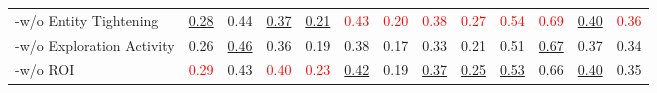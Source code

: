 \begin{table}[htbp]
{\begin{tabular}{l|cc|cc|cc|cc|cc|cc}
\quad -w/o Entity Tightening & \underline{0.28} & 0.44 & \underline{0.37} & \underline{0.21} & \textcolor{red}{0.43} & \textcolor{red}{0.20} & \textcolor{red}{0.38} & \textcolor{red}{0.27} & \textcolor{red}{0.54} & \textcolor{red}{0.69} & \underline{0.40} & \textcolor{red}{0.36} \\
\quad -w/o Exploration Activity & 0.26 & \underline{0.46} & 0.36 & 0.19 & 0.38 & 0.17 & 0.33 & 0.21 & 0.51 & \underline{0.67} & 0.37 & 0.34 \\
\quad -w/o ROI & \textcolor{red}{0.29} & 0.43 & \textcolor{red}{0.40} & \textcolor{red}{0.23} & \underline{0.42} & 0.19 & \underline{0.37} & \underline{0.25} & \underline{0.53} & 0.66 & \underline{0.40} & 0.35 \\
\bottomrule
\end{tabular}%
}
\label{tab:main-baselines-tasktype-rte-lj}
\end{table}
